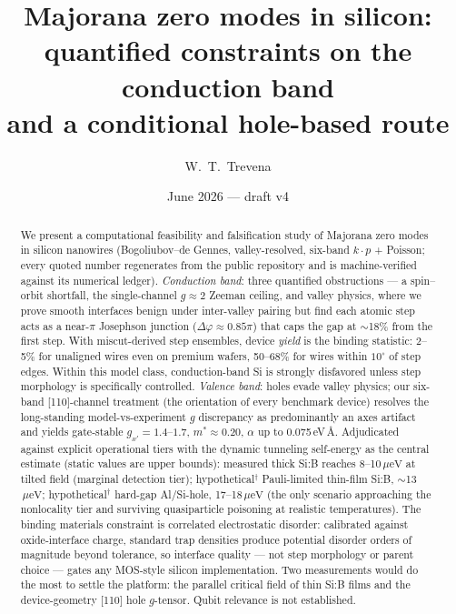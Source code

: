 \documentclass[11pt]{article}
\title{Majorana zero modes in silicon: quantified constraints on the conduction band\\
and a conditional hole-based route}
\author{W.~T.~Trevena}
\date{June 2026 --- draft v4}
\newcommand{\ueV}{\,\mu\mathrm{eV}}
\begin{document}
\maketitle

\begin{abstract}
We present a computational feasibility and falsification study of Majorana
zero modes in silicon nanowires (Bogoliubov--de Gennes, valley-resolved,
six-band $k\cdot p$ + Poisson; every quoted number regenerates from the
public repository and is machine-verified against its numerical ledger).
\emph{Conduction band}: three quantified obstructions --- a spin--orbit
shortfall, the single-channel $g \approx 2$ Zeeman ceiling, and valley
physics, where we prove smooth interfaces benign under inter-valley pairing
but find each atomic step acts as a near-$\pi$ Josephson junction
($\Delta\varphi \approx 0.85\pi$) that caps the gap at $\sim$18\% from the
first step. With miscut-derived step ensembles, device \emph{yield} is the
binding statistic: 2--5\% for unaligned wires even on premium wafers,
50--68\% for wires within $10^\circ$ of step edges. Within this model
class, conduction-band Si is strongly disfavored unless step morphology is
specifically controlled. \emph{Valence band}: holes evade valley physics;
our six-band [110]-channel treatment (the orientation of every benchmark
device) resolves the long-standing model-vs-experiment $g$ discrepancy as
predominantly an axes artifact and yields gate-stable
$g_{x'} = 1.4$--$1.7$, $m^* \approx 0.20$, $\alpha$ up to
0.075\,eV\,\AA. Adjudicated against explicit operational tiers with the
dynamic tunneling self-energy as the central estimate (static values are
upper bounds): measured thick Si:B reaches 8--10$\ueV$ at tilted field
(marginal detection tier); hypothetical$^\dagger$ Pauli-limited thin-film
Si:B, $\sim$13$\ueV$; hypothetical$^\dagger$ hard-gap Al/Si-hole,
17--18$\ueV$ (the only scenario approaching the nonlocality tier and
surviving quasiparticle poisoning at realistic temperatures). The binding
materials constraint is correlated electrostatic disorder: calibrated
against oxide-interface charge, standard trap densities produce potential
disorder orders of magnitude beyond tolerance, so interface quality ---
not step morphology or parent choice --- gates any MOS-style silicon
implementation. Two measurements would do the most to settle the platform:
the parallel critical field of thin Si:B films and the device-geometry
[110] hole $g$-tensor. Qubit relevance is not established.
\end{abstract}
\end{document}

